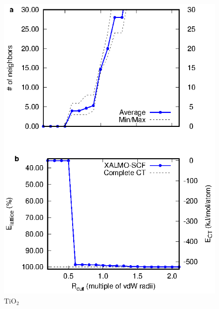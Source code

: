 \documentclass[aps,prb,twocolumn,amsmath,amssymb,superscriptaddress,longbibliography]{revtex4-1}
\begin{document}
\begin{figure}
\includegraphics[scale=1]{plots/TiO2_EvRneutral}
\caption{$\text{TiO}_{2}$}
\label{tio2n}
\end{figure}
\end{document}
